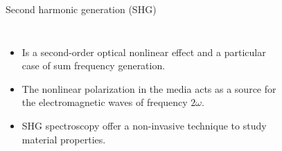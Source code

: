 \documentclass{beamer}
\begin{document}
\begin{frame}

\vspace{-0.2cm}

\noindent\makebox[\linewidth]{\rule{\linewidth}{0.4pt}}

\vspace{-2.0mm}
\begin{center}
{\large Second harmonic generation (SHG)}
\end{center}

\vspace{-6mm}
\noindent\makebox[\linewidth]{\rule{\linewidth}{0.4pt}}



\begin{columns}


{\small


\begin{itemize}

\item 
Is a second-order optical nonlinear effect and a particular case of sum
frequency generation.

\item 
The nonlinear polarization in the media acts as a source for the
electromagnetic waves of frequency $2\omega$.

\item 
SHG spectroscopy offer a non-invasive technique to study material properties.

\end{itemize}
}


\begin{figure}[h!]
\begin{tikzpicture}


\end{tikzpicture}
\end{figure}
\end{columns}
\end{frame}
\end{document}
